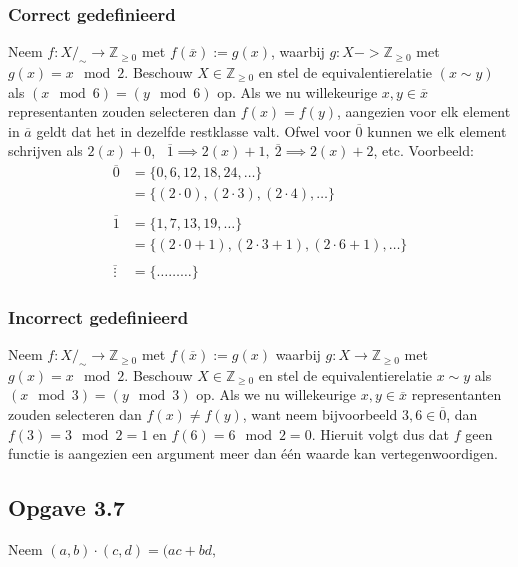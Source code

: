 \documentclass{article}
\newcommand{\Zg}{\mathbb{Z}_{\geq 0}}
\newcommand{\q}{/_\sim}
\newcommand{\ol}[1]{\overline{#1}}
\begin{document}
\subsubsection*{Correct gedefinieerd}
Neem $f: X\q \rightarrow \Zg$ met $f(\ol{x}) := g(x)$, waarbij $g: X -> \Zg$ met $g(x) = x \mod 2$.
Beschouw $X \in \Zg$ en stel de equivalentierelatie $(x \sim y)$ als $(x \mod 6) = (y \mod 6)$ op.
Als we nu willekeurige $x, y \in \ol{x}$ representanten zouden selecteren dan $f(x) = f(y)$, 
aangezien voor elk element in $\ol{a}$ geldt dat het in dezelfde restklasse valt. Ofwel
voor $\ol{0}$ kunnen we elk element schrijven als $2(x) + 0$, \ $\ol{1} \implies 2(x) + 1, \ \ol{2} \implies 2(x) + 2$, etc.
Voorbeeld:
\begin{align*}
	\ol{0} &= \{0, 6, 12, 18, 24, \dots \} \\
	&= \{(2\cdot0), (2\cdot3), (2\cdot4), \dots \} \\ \\ 
	\ol{1} &= \{1, 7, 13, 19, \dots \} \\
	&= \{(2\cdot 0 + 1), (2\cdot3 + 1), (2 \cdot 6 + 1), \dots \} \\ \\
	\ol{\vdots} &= \{ \dots \dots \dots \}
\end{align*}
\subsubsection*{Incorrect gedefinieerd}
Neem $f: X\q \rightarrow \Zg$ met $f(\ol{x}) := g(x)$ waarbij $g: X \rightarrow \Zg$ met $g(x) = x \mod 2$.
Beschouw $X \in \Zg$ en stel de equivalentierelatie $x \sim y$ als $(x \mod 3) = (y \mod 3)$ op. 
Als we nu willekeurige $x, y \in \ol{x}$ representanten zouden selecteren dan $f(x) \neq f(y)$, want  
neem bijvoorbeeld $3, 6 \in \ol{0}$, dan $f(3) = 3 \mod 2 = \boxed{1}$ en $f(6) = 6 \mod 2 = \boxed{0}$. 
Hieruit volgt dus dat $f$ geen functie is aangezien een argument meer dan één waarde kan vertegenwoordigen. 

\subsection*{Opgave 3.7}
Neem $(a,b)\cdot(c,d) = (ac + bd,  $
\end{document}
